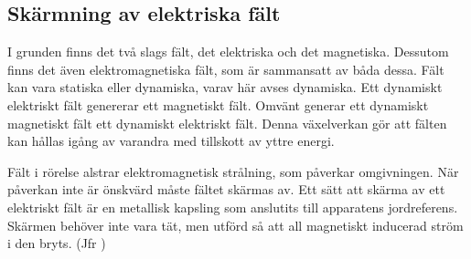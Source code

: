 \subsection{Skärmning av elektriska fält}
\label{elektrostatik skärmning}

I grunden finns det två slags fält, det elektriska och det magnetiska.
Dessutom finns det även elektromagnetiska fält, som är sammansatt av båda dessa.
Fält kan vara statiska eller dynamiska, varav här avses dynamiska.
Ett dynamiskt elektriskt fält genererar ett magnetiskt fält.
Omvänt generar ett dynamiskt magnetiskt fält ett dynamiskt elektriskt fält.
Denna växelverkan gör att fälten kan hållas igång av varandra med tillskott av
yttre energi.

Fält i rörelse alstrar elektromagnetisk strålning, som påverkar omgivningen.
När påverkan inte är önskvärd måste fältet skärmas av.
Ett sätt att skärma av ett elektriskt fält är en metallisk kapsling som
anslutits till apparatens jordreferens.
Skärmen behöver inte vara tät, men utförd så att all magnetiskt inducerad ström
i den bryts. (Jfr )
